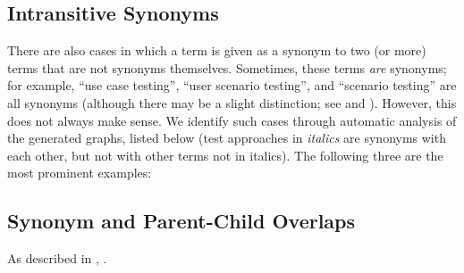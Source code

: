 \subsection{Intransitive Synonyms}\label{multiSyns}
There are also cases in which a term is given as a synonym to two (or more)
terms that are not synonyms themselves. Sometimes, these terms
\emph{are} synonyms; for example, \citetISTQB{} 
``use case testing'', ``user scenario testing'', and ``scenario testing'' are
all synonyms (although there may be a slight distinction; see
 and ).
%
%
%
%
However, this does not always make sense. We identify \multiSynCount{}
such cases through automatic analysis of the generated graphs\ifnotpaper,
listed below (test approaches in \emph{italics} are synonyms with each other,
but not with other terms not in italics)\else. The following three are the most prominent examples\fi:

\begin{enumerate}
    
\end{enumerate}

\subsection{Synonym and Parent-Child Overlaps}\label{parSyns-full}
As described in , \parSynIntro*{}.
\begin{landscape}
    
\end{landscape}
